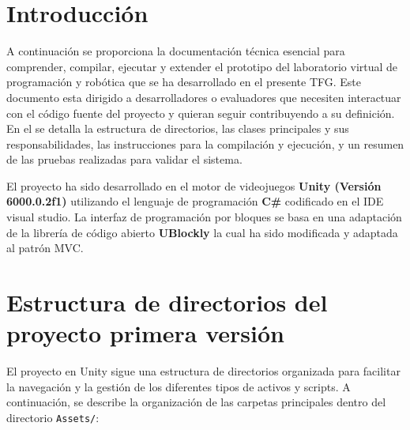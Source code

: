 
\section{Introducción}
A continuación se proporciona la documentación técnica esencial para comprender, compilar, ejecutar y extender el prototipo del laboratorio virtual de programación y robótica que se ha desarrollado en el presente TFG. Este documento esta dirigido a desarrolladores o evaluadores que necesiten interactuar con el código fuente del proyecto y quieran seguir contribuyendo a su definición. En el se detalla la estructura de directorios, las clases principales y sus responsabilidades, las instrucciones para la compilación y ejecución, y un resumen de las pruebas realizadas para validar el sistema.


El proyecto ha sido desarrollado en el motor de videojuegos \textbf{Unity (Versión 6000.0.2f1)} utilizando el lenguaje de programación \textbf{C\#} codificado en el IDE visual studio. La interfaz de programación por bloques se basa en una adaptación de la librería de código abierto \textbf{UBlockly} \cite{UBlockly} la cual ha sido modificada y adaptada al patrón MVC.

\section{Estructura de directorios del proyecto primera versión}
El proyecto en Unity sigue una estructura de directorios organizada para facilitar la navegación y la gestión de los diferentes tipos de activos y scripts. A continuación, se describe la organización de las carpetas principales dentro del directorio \texttt{Assets/}:

